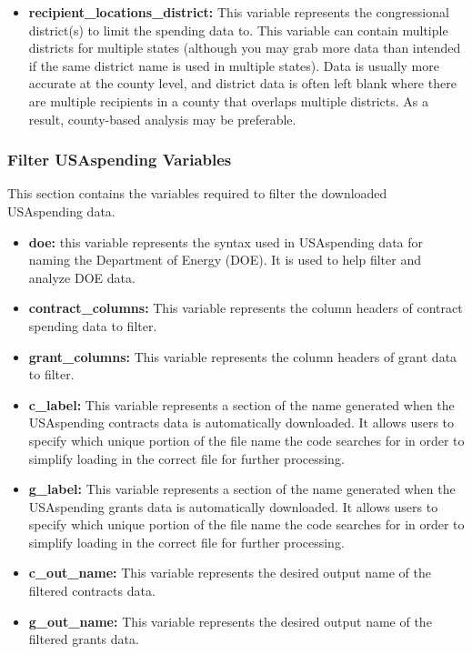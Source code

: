 \documentclass[
]{book}
\providecommand{\tightlist}{%
  \setlength{\itemsep}{0pt}\setlength{\parskip}{0pt}}
\begin{document}
\begin{itemize}
\item
  \textbf{recipient\_locations\_district:} This variable represents the congressional district(s) to limit the spending data to. This variable can contain multiple districts for multiple states (although you may grab more data than intended if the same district name is used in multiple states). Data is usually more accurate at the county level, and district data is often left blank where there are multiple recipients in a county that overlaps multiple districts. As a result, county-based analysis may be preferable.
\end{itemize}

\hypertarget{filter}{%
\subsubsection{Filter USAspending Variables}\label{filter}}

This section contains the variables required to filter the downloaded USAspending data.

\begin{itemize}
\tightlist
\item
  \textbf{doe:} this variable represents the syntax used in USAspending data for naming the Department of Energy (DOE). It is used to help filter and analyze DOE data.\\
\item
  \textbf{contract\_columns:} This variable represents the column headers of contract spending data to filter.
\item
  \textbf{grant\_columns:} This variable represents the column headers of grant data to filter.
\item
  \textbf{c\_label:} This variable represents a section of the name generated when the USAspending contracts data is automatically downloaded. It allows users to specify which unique portion of the file name the code searches for in order to simplify loading in the correct file for further processing.
\item
  \textbf{g\_label:} This variable represents a section of the name generated when the USAspending grants data is automatically downloaded. It allows users to specify which unique portion of the file name the code searches for in order to simplify loading in the correct file for further processing.
\item
  \textbf{c\_out\_name:} This variable represents the desired output name of the filtered contracts data.
\item
  \textbf{g\_out\_name:} This variable represents the desired output name of the filtered grants data.
\end{itemize}
\end{document}
